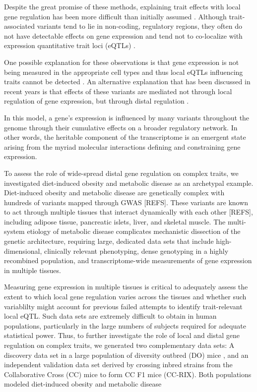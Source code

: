\documentclass[
]{article}
\begin{document}
Despite the great promise of these methods, explaining trait effects
with local gene regulation has been more difficult than initially
assumed \cite{pmid32912663, pmid36515579}. Although trait-associated
variants tend to lie in non-coding, regulatory regions, they often do
not have detectable effects on gene expression \cite{pmid32912663} and
tend not to co-localize with expression quantitative trait loci (eQTLs)
\cite{pmid36515579, pmid37857933}.

One possible explanation for these observations is that gene expression
is not being measured in the appropriate cell types and thus local eQTLs
influencing traits cannot be detected \cite{pmid32912663}. An
alternative explanation that has been discussed in recent years is that
effects of these variants are mediated not through local regulation of
gene expression, but through distal regulation
\cite{pmid37857933, pmid32424349, 
pmid32831138, pmid30950127}.

In this model, a gene's expression is influenced by many variants
throughout the genome through their cumulative effects on a broader
regulatory network. In other words, the heritable component of the
transcriptome is an emergent state arising from the myriad molecular
interactions defining and constraining gene expression.

To assess the role of wide-spread distal gene regulation on complex
traits, we investigated diet-induced obesity and metabolic disease as an
archetypal example. Diet-induced obesity and metabolic disease are
genetically complex with hundreds of variants mapped through GWAS
{[}REFS{]}. These variants are known to act through multiple tissues
that interact dynamically with each other {[}REFS{]}, including adipose
tissue, pancreatic islets, liver, and skeletal muscle. The multi-system
etiology of metabolic disease complicates mechanistic dissection of the
genetic architecture, requiring large, dedicated data sets that include
high-dimensional, clinically relevant phenotyping, dense genotyping in a
highly recombined population, and transcriptome-wide measurements of
gene expression in multiple tissues.

Measuring gene expression in multiple tissues is critical to adequately
assess the extent to which local gene regulation varies across the
tissues and whether such variablilty might account for previous failed
attempts to identify trait-relevant local eQTL. Such data sets are
extremely difficult to obtain in human populations, particularly in the
large numbers of subjects required for adequate statistical power. Thus,
to further investigate the role of local and distal gene regulation on
complex traits, we generated two complementary data sets: A discovery
data set in a large population of diversity outbred (DO) mice
\cite{pmid22892839}, and an independent validation data set derived by
crossing inbred strains from the Collaborative Cross (CC) mice
\cite{pmid18716833} to form CC F1 mice (CC-RIX). Both populations
modeled diet-induced obesity and metabolic disease \cite{pmid29567659}
\end{document}
